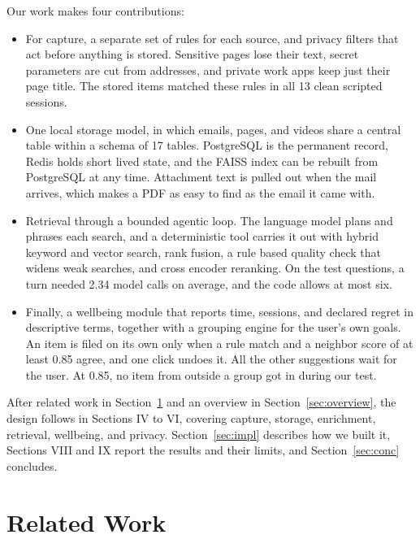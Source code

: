 \documentclass[conference]{IEEEtran}
\begin{document}
Our work makes four contributions:
\begin{itemize}
\item For capture, a separate set of rules for each source, and privacy filters that act before anything is stored. Sensitive pages lose their text, secret parameters are cut from addresses, and private work apps keep just their page title. The stored items matched these rules in all 13 clean scripted sessions.
\item One local storage model, in which emails, pages, and videos share a central table within a schema of 17 tables. PostgreSQL is the permanent record, Redis holds short lived state, and the FAISS index can be rebuilt from PostgreSQL at any time. Attachment text is pulled out when the mail arrives, which makes a PDF as easy to find as the email it came with.
\item Retrieval through a bounded agentic loop. The language model plans and phrases each search, and a deterministic tool carries it out with hybrid keyword and vector search, rank fusion, a rule based quality check that widens weak searches, and cross encoder reranking. On the test questions, a turn needed 2.34 model calls on average, and the code allows at most six.
\item Finally, a wellbeing module that reports time, sessions, and declared regret in descriptive terms, together with a grouping engine for the user's own goals. An item is filed on its own only when a rule match and a neighbor score of at least 0.85 agree, and one click undoes it. All the other suggestions wait for the user. At 0.85, no item from outside a group got in during our test.
\end{itemize}

After related work in Section~\ref{sec:related} and an overview in Section~\ref{sec:overview}, the design follows in Sections IV to VI, covering capture, storage, enrichment, retrieval, wellbeing, and privacy. Section~\ref{sec:impl} describes how we built it, Sections VIII and IX report the results and their limits, and Section~\ref{sec:conc} concludes.

\section{Related Work}\label{sec:related}
\end{document}
